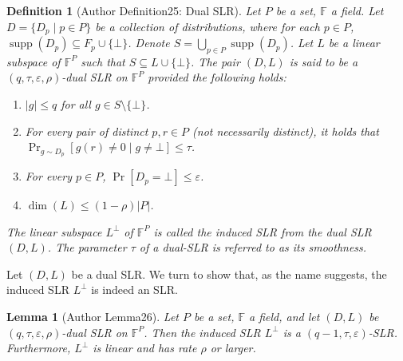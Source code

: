 \documentclass[10pt,a4paper]{article}
\newtheorem{ntdefinition}[nttheorem]{Definition}
\newtheorem{ntlemma}[nttheorem]{Lemma}
\begin{document}
\begin{ntdefinition}[Author Definition25: Dual SLR]
Let $P$ be a set, $\mathbb F$ a field. Let $D=\{D_p\mid p\in P\}$ be a collection of distributions, where for each $p\in P$, $\operatorname{supp}(D_p)\subseteq F_p\cup\{\bot\}$. Denote $S=\bigcup_{p\in P}\operatorname{supp}(D_p)$. Let $L$ be a linear subspace of $\mathbb F^P$ such that $S\subseteq L\cup\{\bot\}$. The pair $(D,L)$ is said to be a $(q,\tau,\varepsilon,\rho)$-dual SLR on $\mathbb F^P$ provided the following holds:
\begin{enumerate}
\item $|g|\leq q$ for all $g\in S\setminus\{\bot\}$.
\item For every pair of distinct $p,r\in P$ (not necessarily distinct), it holds that $\Pr_{g\sim D_p}[g(r)\ne0\mid g\ne\bot]\leq\tau$.
\item For every $p\in P$, $\Pr[D_p=\bot]\leq\varepsilon$.
\item $\dim(L)\leq(1-\rho)|P|$.
\end{enumerate}
The linear subspace $L^\perp$ of $\mathbb F^P$ is called the induced SLR from the dual SLR $(D,L)$. The parameter $\tau$ of a dual-SLR is referred to as its smoothness.
\end{ntdefinition}
Let $(D,L)$ be a dual SLR. We turn to show that, as the name suggests, the induced SLR $L^\perp$ is indeed an SLR.
\begin{ntlemma}[Author Lemma26]
Let $P$ be a set, $\mathbb F$ a field, and let $(D,L)$ be $(q,\tau,\varepsilon,\rho)$-dual SLR on $\mathbb F^P$. Then the induced SLR $L^\perp$ is a $(q-1,\tau,\varepsilon)$-SLR. Furthermore, $L^\perp$ is linear and has rate $\rho$ or larger.
\end{ntlemma}
\end{document}
